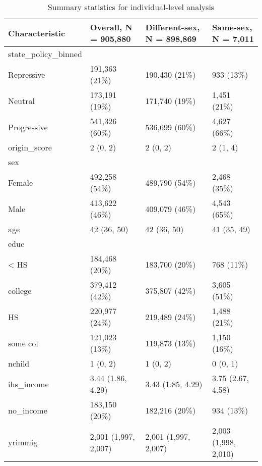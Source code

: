 \documentclass[
  11pt,
]{article}
\begin{document}
\begin{table}

\caption{\label{tab:desc-table-ind}Summary statistics for individual-level analysis}
\centering
\fontsize{8}{10}\selectfont
\begin{tabular}[t]{llll}
\toprule
Characteristic & Overall, N = 905,880 & Different-sex, N = 898,869 & Same-sex, N = 7,011\\
\midrule
state\_policy\_binned &  &  & \\
\hspace{1em}Repressive & 191,363 (21\%) & 190,430 (21\%) & 933 (13\%)\\
\hspace{1em}Neutral & 173,191 (19\%) & 171,740 (19\%) & 1,451 (21\%)\\
\hspace{1em}Progressive & 541,326 (60\%) & 536,699 (60\%) & 4,627 (66\%)\\
origin\_score & 2 (0, 2) & 2 (0, 2) & 2 (1, 4)\\
\addlinespace
sex &  &  & \\
\hspace{1em}Female & 492,258 (54\%) & 489,790 (54\%) & 2,468 (35\%)\\
\hspace{1em}Male & 413,622 (46\%) & 409,079 (46\%) & 4,543 (65\%)\\
age & 42 (36, 50) & 42 (36, 50) & 41 (35, 49)\\
educ &  &  & \\
\addlinespace
\hspace{1em}< HS & 184,468 (20\%) & 183,700 (20\%) & 768 (11\%)\\
\hspace{1em}college & 379,412 (42\%) & 375,807 (42\%) & 3,605 (51\%)\\
\hspace{1em}HS & 220,977 (24\%) & 219,489 (24\%) & 1,488 (21\%)\\
\hspace{1em}some col & 121,023 (13\%) & 119,873 (13\%) & 1,150 (16\%)\\
nchild & 1 (0, 2) & 1 (0, 2) & 0 (0, 1)\\
\addlinespace
ihs\_income & 3.44 (1.86, 4.29) & 3.43 (1.85, 4.29) & 3.75 (2.67, 4.58)\\
no\_income & 183,150 (20\%) & 182,216 (20\%) & 934 (13\%)\\
yrimmig & 2,001 (1,997, 2,007) & 2,001 (1,997, 2,007) & 2,003 (1,998, 2,010)\\

\end{tabular}
\end{table}
\end{document}
